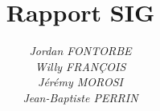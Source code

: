 \documentclass{beamer}
\begin{document}
\title{}
\title{\textbf{Rapport SIG}}
\author{
	\textit{Jordan FONTORBE}\\
	\textit{Willy FRANÇOIS}\\
	\textit{Jérémy MOROSI}\\
	\textit{Jean-Baptiste PERRIN}
}
\maketitle
\end{document}
